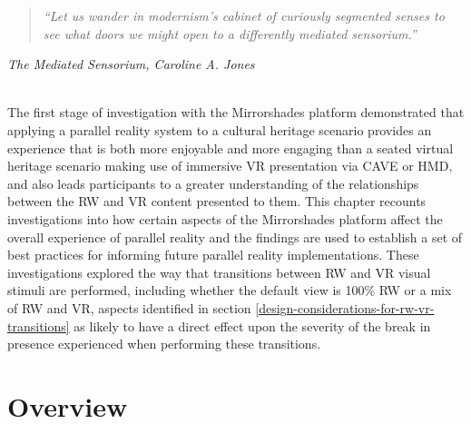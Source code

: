 
\begin{quote}
	\textit{``Let us wander in modernism's cabinet of curiously segmented senses to see what doors we might open to a differently mediated sensorium.''}
\end{quote}
\hfill \textit{The Mediated Sensorium, Caroline A. Jones}
\\
\\


\label{chapter-eval-2}

The first stage of investigation with the Mirrorshades platform demonstrated that applying a parallel reality system to a cultural heritage scenario provides an experience that is both more enjoyable and more engaging than a seated virtual heritage scenario making use of immersive VR presentation via CAVE or HMD, and also leads participants to a greater understanding of the relationships between the RW and VR content presented to them. This chapter recounts investigations into how certain aspects of the Mirrorshades platform affect the overall experience of parallel reality and the findings are used to establish a set of best practices for informing future parallel reality implementations. These investigations explored the way that transitions between RW and VR visual stimuli are performed, including whether the default view is 100\% RW or a mix of RW and VR, aspects identified in section \ref{design-considerations-for-rw-vr-transitions} as likely to have a direct effect upon the severity of the break in presence experienced when performing these transitions.


\section{Overview}

